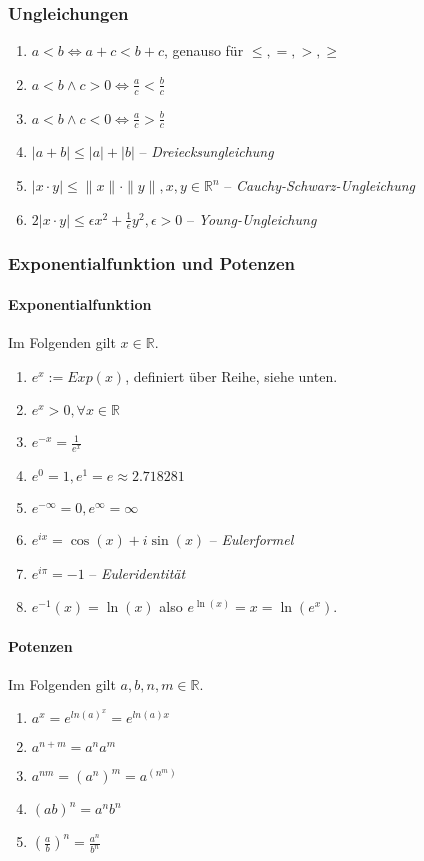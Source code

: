 \documentclass[a4paper, 9pt, DIV=24]{scrartcl}
\begin{document}
\subsubsection{Ungleichungen}
\begin{enumerate}[label={(}\arabic*{)}]
 \item $a < b \iff a + c < b + c$, genauso für $\leq,=,>,\geq$
 \item $a < b \wedge c > 0 \iff \frac{a}{c} < \frac{b}{c}$
 \item $a < b \wedge c < 0 \iff \frac{a}{c} > \frac{b}{c}$
 \item $|a+b| \leq |a| + |b|$ -- \emph{Dreiecksungleichung}
 \item $|x\cdot y| \leq \|x\|\cdot\|y\|, x,y \in \mathbb{R}^n$ -- \emph{Cauchy-Schwarz-Ungleichung}
 \item $2|x\cdot y| \leq \epsilon x^2 + \frac{1}{\epsilon}y^2, \epsilon > 0$ -- \emph{Young-Ungleichung}
\end{enumerate}

\subsubsection{Exponentialfunktion und Potenzen}
\paragraph{Exponentialfunktion} Im Folgenden gilt $x \in\mathbb{R}$.
\begin{enumerate}[label={(}\arabic*{)}]
 \item $e^x := Exp(x)$, definiert über Reihe, siehe unten.
 \item $e^x > 0, \forall x\in\mathbb{R}$
 \item $e^{-x} = \frac{1}{e^x}$
 \item $e^0 = 1, e^1 = e \approx 2.718281$
 \item $e^{-\infty} = 0, e^{\infty} = \infty$
 \item $e^{ix} = \cos(x) + i\sin(x)$ – \emph{Eulerformel}
 \item $e^{i\pi} = -1$ – \emph{Euleridentität}
 \item $e^{-1}(x) = \ln(x)$ also $e^{\ln(x)} = x = \ln(e^x)$.
\end{enumerate}
\paragraph{Potenzen} Im Folgenden gilt $a,b,n,m \in\mathbb{R}$.
\begin{enumerate}[label={(}\arabic*{)}]
 \item $a^x = e^{ln(a)^{x}} = e^{ln(a)x}$
 \item $a^{n+m} = a^na^m$
 \item $a^{nm} = (a^n)^m = a^{(n^m)}$
 \item $(ab)^n = a^nb^n$
 \item $(\frac{a}{b})^n = \frac{a^n}{b^n}$
\end{enumerate}
\end{document}
